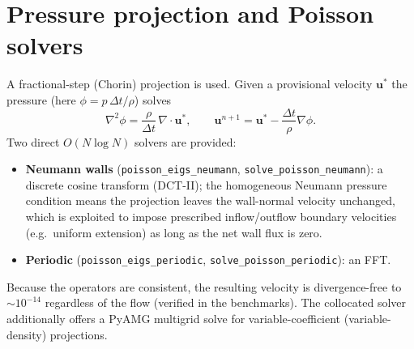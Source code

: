 \documentclass[11pt]{article}
\newcommand{\uv}{\bm{u}}
\newcommand{\grad}{\nabla}
\begin{document}
\section{Pressure projection and Poisson solvers}
A fractional-step (Chorin) projection is used. Given a provisional velocity
$\uv^{*}$ the pressure (here $\phi=p\,\Delta t/\rho$) solves
\begin{equation}
\nabla^2\phi = \frac{\rho}{\Delta t}\,\grad\!\cdot\!\uv^{*},
\qquad
\uv^{n+1} = \uv^{*}-\frac{\Delta t}{\rho}\grad\phi .
\end{equation}
Two direct $O(N\log N)$ solvers are provided:
\begin{itemize}[nosep]
  \item \textbf{Neumann walls} (\texttt{poisson\_eigs\_neumann},
  \texttt{solve\_poisson\_neumann}): a discrete cosine transform (DCT-II); the
  homogeneous Neumann pressure condition means the projection leaves the wall-normal
  velocity unchanged, which is exploited to impose prescribed inflow/outflow
  boundary velocities (e.g.\ uniform extension) as long as the net wall flux is zero.
  \item \textbf{Periodic} (\texttt{poisson\_eigs\_periodic},
  \texttt{solve\_poisson\_periodic}): an FFT.
\end{itemize}
Because the operators are consistent, the resulting velocity is divergence-free to
$\sim\!10^{-14}$ regardless of the flow (verified in the benchmarks). The collocated
solver additionally offers a PyAMG multigrid solve for variable-coefficient
(variable-density) projections.
\end{document}
